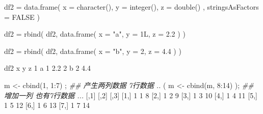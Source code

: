 \documentclass[
]{article}
\newenvironment{Shaded}{}{}
\newcommand{\AttributeTok}[1]{\textcolor[rgb]{0.49,0.56,0.16}{#1}}
\newcommand{\ConstantTok}[1]{\textcolor[rgb]{0.53,0.00,0.00}{#1}}
\newcommand{\DecValTok}[1]{\textcolor[rgb]{0.25,0.63,0.44}{#1}}
\newcommand{\DocumentationTok}[1]{\textcolor[rgb]{0.73,0.13,0.13}{\textit{#1}}}
\newcommand{\FloatTok}[1]{\textcolor[rgb]{0.25,0.63,0.44}{#1}}
\newcommand{\FunctionTok}[1]{\textcolor[rgb]{0.02,0.16,0.49}{#1}}
\newcommand{\NormalTok}[1]{#1}
\newcommand{\OtherTok}[1]{\textcolor[rgb]{0.00,0.44,0.13}{#1}}
\newcommand{\SpecialCharTok}[1]{\textcolor[rgb]{0.25,0.44,0.63}{#1}}
\newcommand{\StringTok}[1]{\textcolor[rgb]{0.25,0.44,0.63}{#1}}
\begin{document}
\begin{Shaded}
\begin{Highlighting}[]
\NormalTok{df2 }\OtherTok{=}
	\FunctionTok{data.frame}\NormalTok{( }
    \AttributeTok{x =} \FunctionTok{character}\NormalTok{(), }
    \AttributeTok{y =} \FunctionTok{integer}\NormalTok{(), }
    \AttributeTok{z =} \FunctionTok{double}\NormalTok{() , }
    \AttributeTok{stringsAsFactors =} \ConstantTok{FALSE} 
\NormalTok{  )}

\NormalTok{df2 }\OtherTok{=}
	\FunctionTok{rbind}\NormalTok{( }
\NormalTok{    df2, }
    \FunctionTok{data.frame}\NormalTok{(}
      \AttributeTok{x =} \StringTok{"a"}\NormalTok{,}
      \AttributeTok{y =}\NormalTok{ 1L, }
      \AttributeTok{z =} \FloatTok{2.2} 
\NormalTok{    ) }
\NormalTok{  )}

\NormalTok{df2 }\OtherTok{=}
	\FunctionTok{rbind}\NormalTok{( }
\NormalTok{    df2, }
    \FunctionTok{data.frame}\NormalTok{( }
      \AttributeTok{x =} \StringTok{"b"}\NormalTok{, }
      \AttributeTok{y =} \DecValTok{2}\NormalTok{, }
      \AttributeTok{z =} \FloatTok{4.4} 
\NormalTok{    ) }
\NormalTok{  )}

\NormalTok{df2}
\NormalTok{  x y   z}
\DecValTok{1}\NormalTok{ a }\DecValTok{1} \FloatTok{2.2}
\DecValTok{2}\NormalTok{ b }\DecValTok{2} \FloatTok{4.4}

\NormalTok{m }\OtherTok{\textless{}{-}} \FunctionTok{cbind}\NormalTok{(}\DecValTok{1}\NormalTok{, }\DecValTok{1}\SpecialCharTok{:}\DecValTok{7}\NormalTok{) ; }\DocumentationTok{\#\# 产生两列数据 7行数据 .. }
\NormalTok{( m }\OtherTok{\textless{}{-}} \FunctionTok{cbind}\NormalTok{(m, }\DecValTok{8}\SpecialCharTok{:}\DecValTok{14}\NormalTok{) ); }\DocumentationTok{\#\# 增加一列 也有7行数据 ... }
\NormalTok{     [,}\DecValTok{1}\NormalTok{] [,}\DecValTok{2}\NormalTok{] [,}\DecValTok{3}\NormalTok{]}
\NormalTok{[}\DecValTok{1}\NormalTok{,]    }\DecValTok{1}    \DecValTok{1}    \DecValTok{8}
\NormalTok{[}\DecValTok{2}\NormalTok{,]    }\DecValTok{1}    \DecValTok{2}    \DecValTok{9}
\NormalTok{[}\DecValTok{3}\NormalTok{,]    }\DecValTok{1}    \DecValTok{3}   \DecValTok{10}
\NormalTok{[}\DecValTok{4}\NormalTok{,]    }\DecValTok{1}    \DecValTok{4}   \DecValTok{11}
\NormalTok{[}\DecValTok{5}\NormalTok{,]    }\DecValTok{1}    \DecValTok{5}   \DecValTok{12}
\NormalTok{[}\DecValTok{6}\NormalTok{,]    }\DecValTok{1}    \DecValTok{6}   \DecValTok{13}
\NormalTok{[}\DecValTok{7}\NormalTok{,]    }\DecValTok{1}    \DecValTok{7}   \DecValTok{14}
\end{Highlighting}
\end{Shaded}
\end{document}
